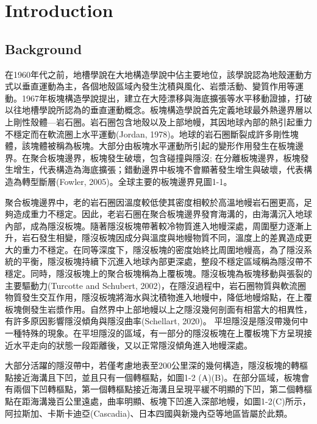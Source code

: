 
\chapter{Introduction}

\section{Background}

在1960年代之前，地槽學說在大地構造學說中佔主要地位，該學說認為地殼運動方式以垂直運動為主，各個地殼區域內發生沈積與風化、岩漿活動、變質作用等運動。1967年板塊構造學說提出，建立在大陸漂移與海底擴張等水平移動證據，打破以往地槽學說所認為的垂直運動概念。板塊構造學說首先定義地球最外熱邊界層以上剛性殼體---岩石圈。岩石圈包含地殼以及上部地幔，其因地球內部的熱引起重力不穩定而在軟流圈上水平運動(Jordan, 1978)。地球的岩石圈斷裂成許多剛性塊體，該塊體被稱為板塊。大部分由板塊水平運動所引起的變形作用發生在板塊邊界。在聚合板塊邊界，板塊發生破壞，包含碰撞與隱沒; 在分離板塊邊界，板塊發生增生，代表構造為海底擴張；錯動邊界中板塊不會顯著發生增生與破壞，代表構造為轉型斷層(Fowler, 2005)。全球主要的板塊邊界見圖1-1。

聚合板塊邊界中，老的岩石圈因溫度較低使其密度相較於高溫地幔岩石圈更高，足夠造成重力不穩定。因此，老岩石圈在聚合板塊邊界發育海溝的，由海溝沉入地球內部，成為隱沒板塊。隨著隱沒板塊帶著較冷物質進入地幔深處，周圍壓力逐漸上升，岩石發生相變，隱沒板塊因成分與溫度與地幔物質不同，溫度上的差異造成更大的重力不穩定。在同等深度下，隱沒板塊的密度始終比周圍地幔高，為了隱沒系統的平衡，隱沒板塊持續下沉進入地球內部更深處，整段不穩定區域稱為隱沒帶不穩定。同時，隱沒板塊上的聚合板塊稱為上覆板塊。隱沒板塊為板塊移動與張裂的主要驅動力(Turcotte and Schubert, 2002)，在隱沒過程中，岩石圈物質與軟流圈物質發生交互作用，隱沒板塊將海水與沈積物進入地幔中，降低地幔熔點，在上覆板塊側發生岩漿作用。自然界中上部地幔以上之隱沒幾何剖面有相當大的相異性，有許多原因影響隱沒傾角與隱沒曲率(Schellart, 2020)。
平坦隱沒是隱沒帶幾何中一種特殊的現象。在平坦隱沒的區域，有一部分的隱沒板塊在上覆板塊下方呈現接近水平走向的狀態一段距離後，又以正常隱沒傾角進入地幔深處。

大部分活躍的隱沒帶中，若僅考慮地表至200公里深的幾何構造，隱沒板塊的轉樞點接近海溝且下凹，並且只有一個轉樞點，如圖1-2 (A)(B)。在部分區域，板塊會有兩個下凹轉樞點，第一個轉樞點接近海溝且呈現平緩不明顯的下凹，第二個轉樞點在距海溝幾百公里遠處，曲率明顯、板塊下凹進入深部地幔，如圖1-2(C)所示，阿拉斯加、卡斯卡迪亞(Cascadia)、日本四國與新幾內亞等地區皆屬於此類。

